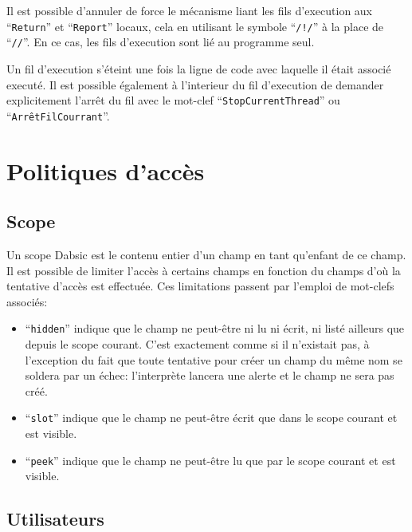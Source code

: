 \documentclass[a5paper, 12pt]{book}
\begin{document}
Il est possible d'annuler de force le mécanisme liant les fils d'execution
aux ``\verb!Return!'' et ``\verb!Report!'' locaux, cela en utilisant le symbole ``\verb|/!/|'' à la place de ``\verb!//!''.
En ce cas, les fils d'execution sont lié au programme seul.

Un fil d'execution s'éteint une fois la ligne de code avec laquelle il était
associé executé. Il est possible également à l'interieur du fil d'execution
de demander explicitement l'arrêt du fil avec le mot-clef ``\verb!StopCurrentThread!''
ou ``\verb!ArrêtFilCourrant!''.


\chapter{Politiques d'accès}

\section{Scope}

Un scope Dabsic est le contenu entier d'un champ en tant
qu'enfant de ce champ. Il est possible de limiter l'accès
à certains champs en fonction du champs d'où la tentative
d'accès est effectuée. Ces limitations passent par l'emploi
de mot-clefs associés:

\begin{itemize}
  \item ``\verb!hidden!'' indique que le champ ne peut-être ni
    lu ni écrit, ni listé ailleurs que depuis le scope courant.
    C'est exactement comme si il n'existait pas, à l'exception
    du fait que toute tentative pour créer un champ du même
    nom se soldera par un échec: l'interprète lancera une
    alerte et le champ ne sera pas créé.
  \item ``\verb!slot!'' indique que le champ ne peut-être écrit
    que dans le scope courant et est visible.
  \item ``\verb!peek!'' indique que le champ ne peut-être lu
    que par le scope courant et est visible.
\end{itemize}

\section{Utilisateurs}
\end{document}
